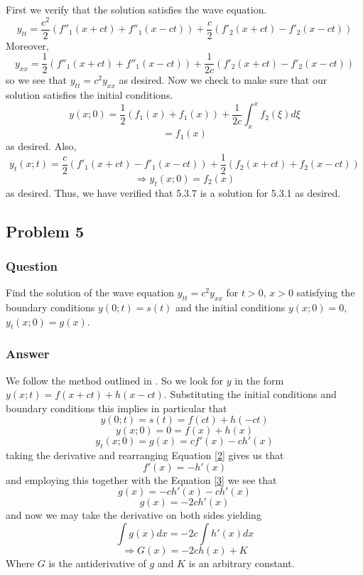 \documentclass[12pt]{article}
\begin{document}
First we verify that the solution satisfies the wave equation.
\[y_{tt}=\frac{c^2}{2}\left(f''_1(x+ct)+ f''_1(x-ct) \right) + \frac{c}{2} \left( f'_2(x+ct)-f'_2(x-ct)  \right) \]
Moreover,
\[y_{xx}=\frac{1}{2}\left(f''_1(x+ct)+ f''_1(x-ct) \right) + \frac{1}{2c} \left( f'_2(x+ct)-f'_2(x-ct)  \right) \]
so we see that $y_{tt}=c^2y_{xx}$ as desired. Now we check to make sure that our solution satisfies the initial conditions.
\[y(x;0)=\frac{1}{2}\left(f_1(x)+f_1(x) \right) + \frac{1}{2c} \int_{x}^{x}f_2(\xi) d\xi \]
\[=f_1(x)  \]
as desired. Also,
\[y_t(x; t)= \frac{c}{2} \left( f'_1(x+ct) - f'_1(x-ct) \right) + \frac{1}{2} \left( f_2(x+ct) + f_2(x-ct) \right) \]
\[ \Rightarrow y_t(x;0)=  f_2(x) \]
as desired. Thus, we have verified that 5.3.7 is a solution for 5.3.1 as desired.





\subsection{Problem 5}
\subsubsection{Question}

Find the solution of the wave equation $y_{tt}=c^2 y_{xx}$ for $t>0$, $x>0$ satisfying the boundary conditions $y(0;t)=s(t)$ and the initial conditions  $y(x;0)=0$, $y_t(x;0)=g(x)$.

\subsubsection{Answer}

We follow the method outlined in \cite[Example 5.3.1 Page 323]{pinsky}. So we look for $y$ in the form $y(x;t)=f(x+ct)+h(x-ct)$. Substituting the initial conditions and boundary conditions this implies in particular that
\begin{equation}\label{1}y(0;t)=s(t)=f(ct)+h(-ct)\end{equation}
\begin{equation}\label{2}y(x;0)=0=f(x)+h(x)\end{equation}
\begin{equation}\label{3}y_t(x;0)=g(x)=c f'(x)-c h'(x)\end{equation}
taking the derivative and rearranging Equation \ref{2} gives us that
\[f'(x)=-h'(x)\]
and employing this together with the Equation \ref{3} we see that
\[g(x)=-c h'(x)-c h'(x)\]
\[g(x)=-2 c h'(x)\]
and now we may take the derivative on both sides yielding
\[\int g(x) dx=-2 c\int h'(x) dx\]
\[\Rightarrow  G(x)  =-2 c  h(x) +K \]
Where $G$ is the antiderivative of $g$ and $K$ is an arbitrary constant.
\end{document}
